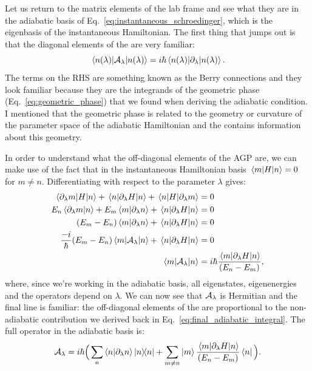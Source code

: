     Let us return to the matrix elements of the lab frame  and see what they are in the adiabatic basis of Eq.~\eqref{eq:instantaneous_schroedinger}, which is the eigenbasis of the instantaneous Hamiltonian. The first thing that jumps out is that the diagonal elements of the  are very familiar:
    \begin{equation}\label{eq:AGP_diagonal}
        \mel{n(\lambda)}{\mathcal{A}_{\lambda}}{n(\lambda)} = i\hbar \mel{n(\lambda)}{\partial_{\lambda}}{n(\lambda)}.
    \end{equation}
    The terms on the RHS are something known as the Berry connections and they look familiar because they are the integrands of the geometric phase (Eq.~\eqref{eq:geometric_phase}) that we found when deriving the adiabatic condition. I mentioned that the geometric phase is related to the geometry or curvature of the parameter space of the adiabatic Hamiltonian and the  contains information about this geometry. 

    In order to understand what the off-diagonal elements of the AGP are, we can make use of the fact that in the instantaneous Hamiltonian basis $\mel{m}{H}{n} = 0$ for $m \neq n$. Differentiating with respect to the parameter $\lambda$ gives:
    \begin{equation}\label{eq:differentiating_adiabatic_offdiagonals}
       \begin{aligned}
           \mel{\partial_{\lambda}m}{H}{n} + \mel{n}{\partial_{\lambda}H}{n} + \mel{n}{H}{\partial_{\lambda}m} &= 0 \\
           E_n \braket{\partial_{\lambda} m}{n} + E_m \braket{m}{\partial_{\lambda} n} + \mel{n}{\partial_{\lambda}H}{n} &= 0 \\
           (E_m - E_n) \braket{m}{\partial_{\lambda} n} + \mel{n}{\partial_{\lambda}H}{n} &= 0 \\
           \frac{-i}{\hbar} (E_m - E_n) \mel{m}{\mathcal{A}_{\lambda}}{n} + \mel{n}{\partial_{\lambda}H}{n} &= 0 \\
           \mel{m}{\mathcal{A}_{\lambda}}{n} &= i\hbar \frac{\mel{m}{\partial_{\lambda}H}{n}}{(E_n - E_m)},
       \end{aligned} 
    \end{equation}
    where, since we're working in the adiabatic basis, all eigenstates, eigenenergies and the operators depend on $\lambda$. We can now see that $\mathcal{A}_{\lambda}$ is Hermitian and the final line is familiar: the off-diagonal elements of the  are proportional to the non-adiabatic contribution we derived back in Eq.~\eqref{eq:final_adiabatic_integral}. The full operator in the adiabatic basis is:
    \begin{equation}\label{eq:AGP_adiabatic_basis}
        \AGP{\lambda} = i\hbar\Big(\sum_n \braket{n}{\dlambda n} \dyad{n} + \sum_{m \neq n} \ket{m} \frac{\mel{m}{\dlambda H}{n}}{(E_n - E_m)} \bra{n} \Big).
    \end{equation}


